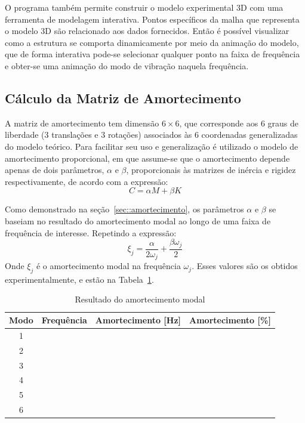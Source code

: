 O programa também permite construir o modelo experimental 3D com uma ferramenta
de modelagem interativa. Pontos específicos da malha que representa o modelo 3D
são relacionado aos dados fornecidos. Então é possível visualizar como a
estrutura se comporta dinamicamente por meio da animação do modelo, que de forma
interativa pode-se selecionar qualquer ponto na faixa de frequência e obter-se
uma animação do modo de vibração naquela frequência.




\subsection{Cálculo da Matriz de Amortecimento}

A matriz de amortecimento tem dimensão $6 \times 6$, que corresponde aos 6 graus
de liberdade (3 translações e 3 rotações) associados às 6 coordenadas
generalizadas do modelo teórico. Para facilitar seu uso e generalização é
utilizado o modelo de amortecimento proporcional, em que assume-se
que o amortecimento depende apenas de dois parâmetros, $\alpha$
e $\beta$, proporcionais às matrizes de inércia e rigidez respectivamente, de
acordo com a expressão:
%
\begin{equation*}
	C = \alpha  M + \beta  K
\end{equation*}
%

Como demonstrado na seção~\ref{sec::amortecimento}, os parâmetros $\alpha$
e $\beta$ se baseiam no resultado do amortecimento modal ao longo de uma
faixa de frequência de interesse. Repetindo a expressão:
%
\begin{equation*} \label{eq::alpha_beta}
	\xi_j = \frac{\alpha}{2 \omega_j} + \frac{\beta \omega_j}{2}
\end{equation*}
%
Onde $\xi_j$ é o amortecimento modal na frequência $ \omega_j$. Esses valores
são os obtidos experimentalmente, e estão na
Tabela~\ref{tab::resultado_modal}.
%
\begin{table}[h]
\centering
\caption{Resultado do amortecimento modal}
\label{tab::resultado_modal}
\begin{tabular}{@{}cccc@{}}
\toprule
Modo & Frequência & Amortecimento {[}Hz{]} & Amortecimento {[}\%{]} \\ \midrule
1    &            &                        &                        \\
2    &            &                        &                        \\
3    &            &                        &                        \\
4    &            &                        &                        \\
5    &            &                        &                        \\
6    &            &                        &                        \\ \bottomrule
\end{tabular}
\end{table}
%

